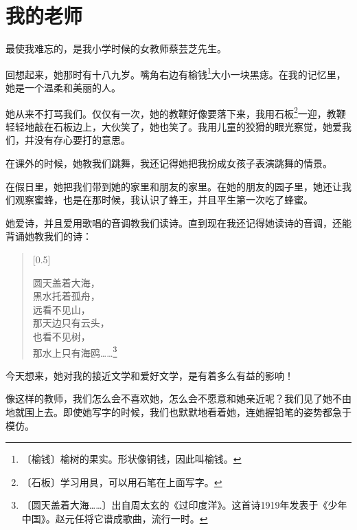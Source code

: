 \documentclass[12pt,UTF-8,openany]{ctexbook}
\begin{document}
\chapter{我的老师}

\begin{large}
    
    最使我难忘的，是我小学时候的女教师蔡芸芝先生。
    
    回想起来，她那时有十八九岁。嘴角右边有榆钱\footnote{〔榆钱〕榆树的果实。形状像铜钱，因此叫榆钱。}大小一块黑痣。在我的记忆里，她是一个温柔和美丽的人。
    
    她从来不打骂我们。仅仅有一次，她的教鞭好像要落下来，我用石板\footnote{〔石板〕学习用具，可以用石笔在上面写字。}一迎，教鞭轻轻地敲在石板边上，大伙笑了，她也笑了。我用儿童的狡猾的眼光察觉，她爱我们，并没有存心要打的意思。
    
    在课外的时候，她教我们跳舞，我还记得她把我扮成女孩子表演跳舞的情景。
    
    在假日里，她把我们带到她的家里和朋友的家里。在她的朋友的园子里，她还让我们观察蜜蜂，也是在那时候，我认识了蜂王，并且平生第一次吃了蜂蜜。
    
    她爱诗，并且爱用歌唱的音调教我们读诗。直到现在我还记得她读诗的音调，还能背诵她教我们的诗：
    
    \begin{verse}[0.5\linewidth]
    
    圆天盖着大海，\\
    
    黑水托着孤舟，\\
    
    远看不见山，\\
    
    那天边只有云头，\\
    
    也看不见树，\\
    
    那水上只有海鸥……\footnote{〔圆天盖着大海……〕出自周太玄的《过印度洋》。这首诗1919年发表于《少年中国》。赵元任将它谱成歌曲，流行一时。}\\
    
    \end{verse}
    
    今天想来，她对我的接近文学和爱好文学，是有着多么有益的影响！
    
    像这样的教师，我们怎么会不喜欢她，怎么会不愿意和她亲近呢？我们见了她不由地就围上去。即使她写字的时候，我们也默默地看着她，连她握铅笔的姿势都急于模仿。
    

\end{large}
\end{document}
